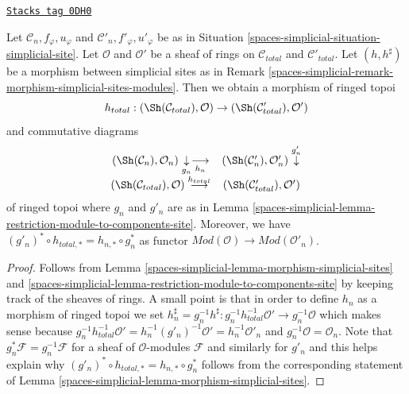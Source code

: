 \begin{lemma}
\label{spaces-simplicial-lemma-morphism-simplicial-sites-modules}
\href{https://stacks.math.columbia.edu/tag/0DH0}{\texttt{Stacks tag 0DH0}}

Let $\mathcal{C}_n, f_\varphi, u_\varphi$ and
$\mathcal{C}'_n, f'_\varphi, u'_\varphi$ be as in
Situation \ref{spaces-simplicial-situation-simplicial-site}.
Let $\mathcal{O}$ and $\mathcal{O}'$
be a sheaf of rings on $\mathcal{C}_{total}$ and $\mathcal{C}'_{total}$.
Let $(h, h^\sharp)$ be a morphism between simplicial sites as in
Remark \ref{spaces-simplicial-remark-morphism-simplicial-sites-modules}.
Then we obtain a morphism of ringed topoi
$$
h_{total} :
(\Sh(\mathcal{C}_{total}), \mathcal{O})
\to
(\Sh(\mathcal{C}'_{total}), \mathcal{O}')
$$
and commutative diagrams
$$
\begin{array}{cc}(\Sh(\mathcal{C}_n), \mathcal{O}_n) \underset{g_n}{\downarrow}\underset{h_n}{\longrightarrow} & (\Sh(\mathcal{C}'_n), \mathcal{O}'_n) \overset{g'_n}{\downarrow} \\ (\Sh(\mathcal{C}_{total}), \mathcal{O}) \overset{h_{total}}{\longrightarrow} & (\Sh(\mathcal{C}'_{total}), \mathcal{O}')\end{array}
$$
of ringed topoi where $g_n$ and $g'_n$ are as in
Lemma \ref{spaces-simplicial-lemma-restriction-module-to-components-site}.
Moreover, we have
$(g'_n)^* \circ h_{total, *} = h_{n, *} \circ g_n^*$
as functor $\textit{Mod}(\mathcal{O}) \to \textit{Mod}(\mathcal{O}'_n)$.
\end{lemma}

\begin{proof}
Follows from
Lemma \ref{spaces-simplicial-lemma-morphism-simplicial-sites} and
\ref{spaces-simplicial-lemma-restriction-module-to-components-site}
by keeping track of the sheaves of rings.
A small point is that in order to define $h_n$ as a morphism
of ringed topoi we set
$h_n^\sharp = g_n^{-1}h^\sharp :
g_n^{-1}h_{total}^{-1}\mathcal{O}' \to g_n^{-1}\mathcal{O}$
which makes sense because
$g_n^{-1}h_{total}^{-1}\mathcal{O}' = h_n^{-1}(g'_n)^{-1}\mathcal{O}' =
h_n^{-1}\mathcal{O}'_n$ and $g_n^{-1}\mathcal{O} = \mathcal{O}_n$.
Note that $g_n^*\mathcal{F} = g_n^{-1}\mathcal{F}$
for a sheaf of $\mathcal{O}$-modules $\mathcal{F}$
and similarly for $g'_n$ and this helps explain why
$(g'_n)^* \circ h_{total, *} = h_{n, *} \circ g_n^*$
follows from the corresponding statement of
Lemma \ref{spaces-simplicial-lemma-morphism-simplicial-sites}.
\end{proof}


